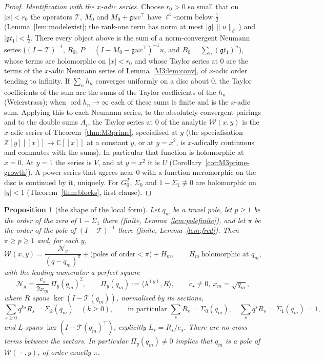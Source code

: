 \documentclass[11pt]{article}
\theoremstyle{plain}
\newtheorem{proposition}[theorem]{Proposition}
\theoremstyle{definition}
\theoremstyle{remark}
\newcommand{\Z}{\mathbb{Z}}
\newcommand{\C}{\mathbb{C}}
\begin{document}
\begin{proof}
\emph{Identification with the $x$-adic series.} Choose $r_0>0$ so small that on $|x|<r_0$ the
operators $\mathcal T$, $M_0$ and $M_0+\mathfrak guv^{\!\top}$ have $\ell^1$-norm below $\tfrac12$
(Lemma~\ref{lem:modelexist}; the rank-one term has norm at most $|\mathfrak g|\,\|u\|_{\ell^1}$) and
$|\mathfrak gt_1|<\tfrac12$. There every object above is the sum
of a norm-convergent Neumann series ($(I-\mathcal T)^{-1}$, $R_0$, $P=(I-M_0-\mathfrak
guv^{\!\top})^{-1}u$, and $B_0=\sum_n(\mathfrak gt_1)^n$), whose terms are holomorphic on
$|x|<r_0$ and whose Taylor series at $0$ are the terms of the $x$-adic Neumann series of
Lemma~\ref{M3:lem:conv}, of $x$-adic order tending to infinity. If $\sum_nh_n$ converges uniformly
on a disc about $0$, the Taylor coefficients of the sum are the sums of the Taylor coefficients of
the $h_n$ (Weierstrass); when $\operatorname{ord}h_n\to\infty$ each of these sums is finite and is
the $x$-adic sum. Applying this to each Neumann series, to the absolutely convergent pairings and
to the double sums $A_i$, the Taylor series at $0$ of the analytic $\mathcal W(x,y)$ is the
$x$-adic series of Theorem~\ref{thm:M3prime}, specialised at $y$ (the specialisation
$\Z[y][[x]]\to\C[[x]]$ at a constant $y$, or at $y=x^2$, is $x$-adically continuous and commutes
with the sums). In particular that function is holomorphic at $x=0$. At $y=1$ the series is $V$,
and at $y=x^2$ it is $U$ (Corollary~\ref{cor:M3prime-growth}). A power series that agrees near $0$
with a function meromorphic on the disc is continued by it, uniquely. For $G^T_0$, $\Sigma_0$ and
$1-\Sigma_1\not\equiv0$ are holomorphic on $|q|<1$ (Theorem~\ref{thm:blocks}, first clause).
\end{proof}

\begin{proposition}[the shape of the local form]\label{prop:shape}
Let $q_m$ be a travel pole, let $p\ge1$ be the order of the zero of $1-\Sigma_1$ there
\textup{(}finite, Lemma~\ref{lem:polefinite}\textup{)}, and let $\pi$ be the order of the pole of
$(I-\mathcal T)^{-1}$ there \textup{(}finite, Lemma~\ref{lem:fred}\textup{)}. Then $\pi\ge p\ge1$
and, for each $y$,
\[
   \mathcal W(x,y)=\frac{\mathcal N_y}{(q-q_m)^{\pi}}+\bigl(\text{poles of order}<\pi\bigr)+H_m ,
   \qquad H_m\ \text{holomorphic at }q_m,
\]
with the leading numerator a perfect square
\begin{equation}\label{eq:junctionpairing}
   \mathcal N_y=\frac{c_\star}{2x_m}\,\Pi_y(q_m)^2,\qquad
   \Pi_y(q_m):=\langle\lambda^{(y)},R\rangle ,\qquad c_\star\ne0,\ x_m=\sqrt{q_m},
\end{equation}
where $R$ spans $\ker(I-\mathcal T(q_m))$, normalised by its sections,
\[
   \sum_{s\ge0}q^{ks}R_s=\Sigma_k(q_m)\quad(k\ge0),\qquad\text{in particular }
   \sum_sR_s=\Sigma_0(q_m),\quad\sum_sq^sR_s=\Sigma_1(q_m)=1 ,
\]
and $L$ spans $\ker(I-\mathcal T(q_m)^{\!\top})$, explicitly $L_s=R_s/e_s$. There are no cross
terms between the sectors. In particular $\Pi_y(q_m)\ne0$ implies that $q_m$ is a pole of $\mathcal W(\,\cdot\,,y)$, of order exactly
$\pi$.
\end{proposition}
\end{document}
